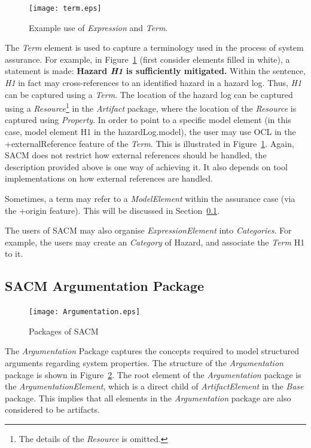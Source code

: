 \begin{figure}
	\centering
	\texttt{[image: term.eps]}
	\caption{Example use of \textit{Expression} and \textit{Term}.}
	\label{fig:termExample}
\end{figure}

The \textit{Term} element is used to capture a terminology used in the process of system assurance. For example, in Figure~\ref{fig:termExample} (first consider elements filled in white), a statement is made: \textbf{Hazard \textit{H1} is sufficiently mitigated.} Within the sentence, \textit{H1} in fact may cross-references to an identified hazard in a hazard log. Thus, \textit{H1} can be captured using a \textit{Term}. 
The location of the hazard log can be captured using a \textit{Resource}\footnote{The details of the \textit{Resource} is omitted.} in the \textit{Artifact} package, where the location of the \textit{Resource} is captured using \textit{Property}. 
In order to point to a specific model element (in this case, model element H1 in the hazardLog.model), the user may use OCL in the +externalReference feature of the \textit{Term}. This is illustrated in Figure~\ref{fig:termExample}.
Again, SACM does not restrict how external references should be handled, the description provided above is one way of achieving it. It also depends on tool implementations on how external references are handled. 

Sometimes, a term may refer to a \textit{ModelElement} within the assurance case (via the +origin feature). This will be discussed in Section~\ref{sec:argPack}.

The users of SACM may also organise \textit{ExpressionElement} into \textit{Categories}. For example, the users may create an \textit{Category} of Hazard, and associate the \textit{Term} H1 to it. 
\subsection{SACM Argumentation Package}
\label{sec:argPack}
\begin{figure}
	\centering
	\texttt{[image: Argumentation.eps]}
	\caption{Packages of SACM}
	\label{fig:arg}
\end{figure}
The \textit{Argumentation} Package captures the concepts required to model structured arguments regarding system properties. The structure of the \textit{Argumentation} package is shown in Figure~\ref{fig:arg}.
The root element of the \textit{Argumentation} package is the \textit{ArgumentationElement}, which is a direct child of \textit{ArtifactElement} in the \textit{Base} package. This implies that all elements in the \textit{Argumentation} package are also considered to be artifacts. 

